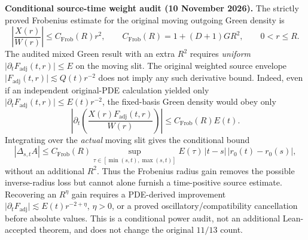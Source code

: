 \documentclass[11pt]{amsart}
\begin{document}
\medskip
\noindent\textbf{Conditional source-time weight audit (10 November 2026).}
The strictly proved Frobenius estimate for the original moving outgoing
Green density is
\[
 \left|\frac{X(r)}{W(r)}\right|
 \le C_{\mathrm{Frob}}(R)r^2,\qquad
 C_{\mathrm{Frob}}(R)=1+(D+1)GR^2,\qquad 0<r\le R.
\]
The audited mixed Green result with an extra \(R^2\) requires
\emph{uniform} \(\lvert\partial_t F_{\mathrm{adj}}(t,r)\rvert\le E\)
on the moving slit. The original weighted source envelope
\(\lvert F_{\mathrm{adj}}(t,r)\rvert\lesssim Q(t)r^{-2}\)
does not imply any such derivative bound.
Indeed, even if an independent original-PDE calculation yielded only
\(\lvert\partial_t F_{\mathrm{adj}}(t,r)\rvert\le E(t)r^{-2}\),
the fixed-basis Green density would obey only
\[
 \left|\partial_t\left(
   \frac{X(r)F_{\mathrm{adj}}(t,r)}{W(r)}\right)\right|
 \le C_{\mathrm{Frob}}(R)E(t).
\]
Integrating over the \emph{actual} moving slit gives the conditional bound
\[
 |\Delta_{s,t}A|
 \le C_{\mathrm{Frob}}(R)\sup_{\tau\in[\min(s,t),\max(s,t)]}E(\tau)\,
   |t-s|\,|r_0(t)-r_0(s)|,
\]
without an additional \(R^2\). Thus the Frobenius radius gain removes
the possible inverse-radius loss but cannot alone furnish a time-positive
source estimate. Recovering an \(R^\eta\) gain requires a
PDE-derived improvement
\(\lvert\partial_tF_{\mathrm{adj}}\rvert
\lesssim E(t)r^{-2+\eta}\), \(\eta>0\), or a proved
oscillatory/compatibility cancellation before absolute values.
This is a conditional power audit, not an additional Lean-accepted
theorem, and does not change the original \(11/13\) count.
\end{document}
